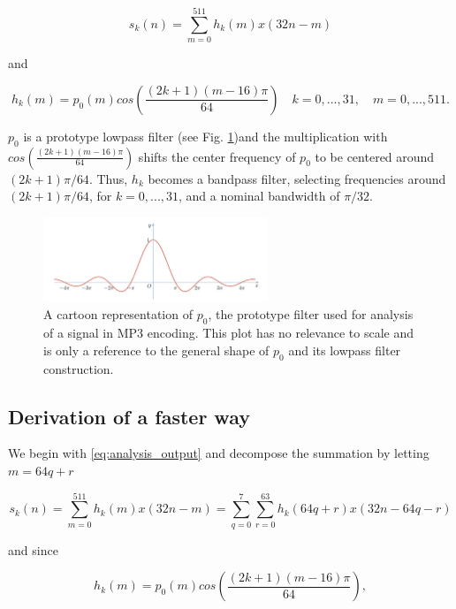 \documentclass[11pt,a4paper]{article}
\begin{document}
\begin{equation} \label{eq:analysis_output}
s_k(n) = \sum_{m=0}^{511} h_k(m) x(32n - m)
\end{equation}

and

\begin{equation}
h_k(m) = p_0(m) cos\left(\frac{(2k + 1) (m-16) \pi}{64} \right) \quad k = 0, ..., 31, \quad m = 0, ..., 511.
\end{equation}

$p_0$ is a prototype lowpass filter (see Fig. \ref{fig:sinc})and the multiplication with $cos\left(\frac{(2k + 1) (m-16) \pi}{64} \right)$ shifts the center frequency of $p_0$ to be centered around $(2k + 1)\pi/64$. Thus, $h_k$ becomes a bandpass filter, selecting frequencies around $(2k + 1)\pi/64$, for $k=0,...,31$, and a nominal bandwidth of $\pi/32$.

\begin{figure}[ht]
	\centering
	\includegraphics[width=0.6\textwidth]{analysis/sinc}
	\caption{A cartoon representation of $p_0$, the prototype filter used for analysis of a signal in MP3 encoding. This plot has no relevance to scale and is only a reference to the general shape of $p_0$ and its lowpass filter construction.}
	\label{fig:sinc}
\end{figure}

\pagebreak

\subsection{Derivation of a faster way}
We begin with \eqref{eq:analysis_output} and decompose the summation by letting $m=64q + r$

\begin{equation}
s_k(n) = \sum_{m=0}^{511} h_k(m)x(32n - m) = \sum_{q=0}^7 \sum_{r=0}^{63} h_k(64q + r)x(32n - 64q - r)
\end{equation}

and since

\begin{equation}
h_k(m) = p_0(m)cos\left(\frac{(2k + 1) (m - 16)\pi}{64} \right),
\end{equation}
\end{document}
